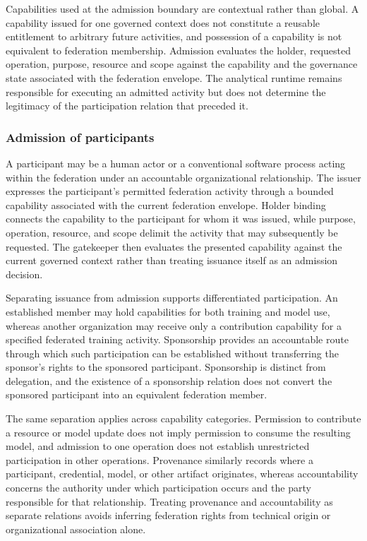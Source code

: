 \documentclass[twoside,11pt]{article}
\begin{document}
Capabilities used at the admission boundary are contextual rather than global. A capability issued for one governed context does not constitute a reusable entitlement to arbitrary future activities, and possession of a capability is not equivalent to federation membership. Admission evaluates the holder, requested operation, purpose, resource and scope against the capability and the governance state associated with the federation envelope. The analytical runtime remains responsible for executing an admitted activity but does not determine the legitimacy of the participation relation that preceded it.

\subsubsection{Admission of participants}
A participant may be a human actor or a conventional software process acting within the federation under an accountable organizational relationship. The issuer expresses the participant's permitted federation activity through a bounded capability associated with the current federation envelope. Holder binding connects the capability to the participant for whom it was issued, while purpose, operation, resource, and scope delimit the activity that may subsequently be requested. The gatekeeper then evaluates the presented capability against the current governed context rather than treating issuance itself as an admission decision.

Separating issuance from admission supports differentiated participation. An established member may hold capabilities for both training and model use, whereas another organization may receive only a contribution capability for a specified federated training activity. Sponsorship provides an accountable route through which such participation can be established without transferring the sponsor's rights to the sponsored participant. Sponsorship is   distinct from delegation, and the existence of a sponsorship relation does not convert the sponsored participant into an equivalent federation member.

The same separation applies across capability categories. Permission to contribute a resource or model update does not imply permission to consume the resulting model, and admission to one operation does not establish unrestricted participation in other operations. Provenance similarly records where a participant, credential, model, or other artifact originates, whereas accountability concerns the authority under which participation occurs and the party responsible for that relationship. Treating provenance and accountability as separate relations avoids inferring federation rights from technical origin or organizational association alone.
\end{document}
